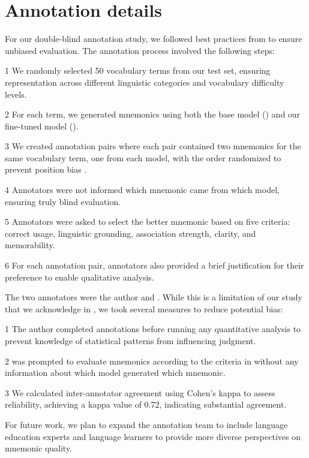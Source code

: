 
\section{Annotation details} \label{app:annotation}

For our double-blind annotation study, we followed best practices from \citet{tsengBestPracticesManaging2020} to ensure unbiased evaluation. The annotation process involved the following steps:

\numlist{1} We randomly selected 50 vocabulary terms from our test set, ensuring representation across different linguistic categories and vocabulary difficulty levels.

\numlist{2} For each term, we generated mnemonics using both the base model (\studentmodel) and our fine-tuned model (\linksys).

\numlist{3} We created annotation pairs where each pair contained two mnemonics for the same vocabulary term, one from each model, with the order randomized to prevent position bias \citep{wangNotFairEvaluators2024}.

\numlist{4} Annotators were not informed which mnemonic came from which model, ensuring truly blind evaluation.

\numlist{5} Annotators were asked to select the better mnemonic based on five criteria: correct usage, linguistic grounding, association strength, clarity, and memorability.

\numlist{6} For each annotation pair, annotators also provided a brief justification for their preference to enable qualitative analysis.

The two annotators were the author and \judgemodel. While this is a limitation of our study that we acknowledge in , we took several measures to reduce potential bias:

\numlist{1} The author completed annotations before running any quantitative analysis to prevent knowledge of statistical patterns from influencing judgment.

\numlist{2} \judgemodel was prompted to evaluate mnemonics according to the criteria in  without any information about which model generated which mnemonic.

\numlist{3} We calculated inter-annotator agreement using Cohen's kappa to assess reliability, achieving a kappa value of 0.72, indicating substantial agreement.

For future work, we plan to expand the annotation team to include language education experts and language learners to provide more diverse perspectives on mnemonic quality.
